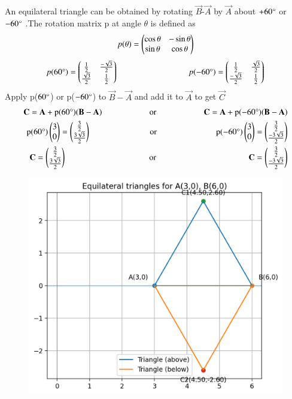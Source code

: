 \documentclass[journal]{IEEEtran}
\begin{document}
An equilateral triangle can be obtained by rotating $\Vec{B}$-$\vec{A}$ by $\Vec{A}$ about $+60\degree$ or $-60\degree$ .The rotation matrix p at angle $\theta$ is defined as\\
\vspace{0.5cm}
\begin{align}
    p(\theta)=\begin{pmatrix}
   \cos \theta & -\sin \theta
    \\
   \sin \theta & \cos \theta
   \end{pmatrix}\\
\end{align}
\begin{align}
    p(60\degree)=\myvec{
   \frac{1}{2} & \frac{-\sqrt{3}}{2}
    \\
   \frac{\sqrt{3}}{2} & \frac{1}{2}
   } \hspace{3cm}
   p(-60\degree)=\myvec{
   \frac{1}{2} & \frac{\sqrt{3}}{2}
    \\
   \frac{-\sqrt{3}}{2} & \frac{1}{2}
   }\\
\end{align}
Apply p($60\degree$) or p($-60\degree$) to $\Vec{B}-\vec{A}$ and add it to $\Vec{A}$ to get $\vec{C}$\\
\begin{align}
    \vec{C}=\vec{A}+\text{p}(60\degree)(\Vec{B}-\vec{A})\hspace{2cm} \text{or} \hspace{2cm}\vec{C}=\vec{A}+\text{p}(-60\degree)(\Vec{B}-\vec{A})\\
    \text{p}(60\degree)\myvec{3\\0}=\myvec{\frac{3}{2}\\\frac{3\sqrt{3}}{2}} \hspace{2.5cm} \text{or} \hspace{2.5cm} \text{p}(-60\degree)\myvec{3\\0}=\myvec{\frac{3}{2}\\\frac{-3\sqrt{3}}{2}}\\
    \vec{C}=\myvec{\frac{3}{2}\\\frac{3\sqrt{3}}{2}} \hspace{3.5cm} \text{or} \hspace{3.9cm} \vec{C}=\myvec{\frac{3}{2}\\\frac{-3\sqrt{3}}{2}}
\end{align}
 \begin{figure}[H]
    \centering
    \includegraphics[width=0.4\columnwidth]{figs/01.png}
    \label{fig-1}
\end{figure}
   


   
\end{document}
